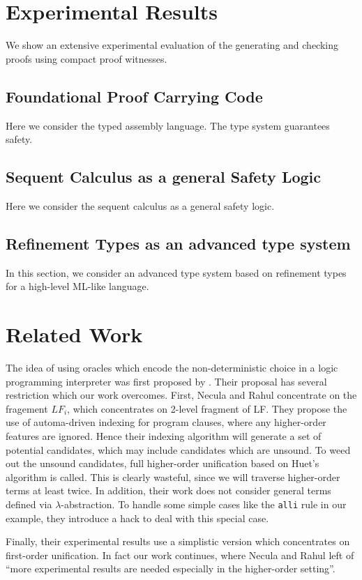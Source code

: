 \documentclass{acmconf}
\begin{document}
\section{Experimental Results}

We show an extensive experimental evaluation of the generating and
checking proofs using compact proof witnesses.

\subsection{Foundational Proof Carrying Code}
Here we consider the typed assembly language. The type system
guarantees safety.

\subsection{Sequent Calculus as a general Safety Logic}
Here we consider the sequent calculus as a general safety logic.

\subsection{Refinement Types as an advanced type system}
In this section, we consider an advanced type system based on
refinement types for a high-level ML-like language. 


\section{Related Work}
The idea of using oracles which encode the non-deterministic choice in
a logic programming interpreter was first proposed by
\cite{necula+:oracles}. Their proposal has several restriction which
our work overcomes. First, Necula and Rahul concentrate on the
fragement $LF_i$, which concentrates on 2-level fragment of
LF. They propose the use of automa-driven indexing for program
clauses, where any higher-order features are ignored. Hence their
indexing algorithm will generate a set of potential candidates, which
may include candidates which are unsound. To weed out the unsound
candidates, full higher-order unification based on Huet's algorithm is
called. This is clearly wasteful, since we will traverse higher-order
terms at least twice. In addition, their work does not consider
general terms defined via $\lambda$-abstraction. To handle some simple
cases like the {\tt alli} rule in our example, they introduce a hack
to deal with this special case.

Finally, their experimental results use a simplistic version which
concentrates on first-order unification.  In fact our work continues,
where Necula and Rahul left of ``more experimental results are needed
especially in the higher-order setting''.
\end{document}
